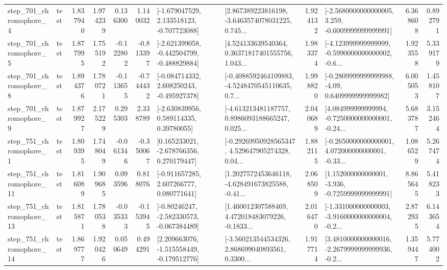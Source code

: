\begin{tabular}{llrrrrllrlrr}
   step\_701\_chromophore\_4 &      test &      1.837940 &    1.974239 &      0.136300 &  1.140032 &   [-1.679047529, 2.133518123, -0.707723088] &  [2.867389223816198, -3.6463574078031225, 0.745... &       1.924132 &  [-2.5680000000000005, 3.259, -0.6009999999999991] &            6.368608 &          0.892791 \\
   step\_701\_chromophore\_5 &      test &      1.877995 &    1.755192 &     -0.122802 & -0.813397 &  [-2.621399058, -0.442504799, -0.488829884] &  [4.524133639540364, 0.36371817401555756, 1.043... &       1.983374 &  [-4.123999999999999, -0.5990000000000002, -0.6... &            1.923558 &          5.339179 \\
   step\_701\_chromophore\_8 &      test &      1.894376 &    1.780721 &     -0.113655 & -0.744432 &   [-0.084714332, 2.608250243, -0.495927378] &  [-0.4088592464109883, -4.5248470545110635, 0.7... &       1.998820 &   [-0.2809999999999988, -4.09, 0.6409999999999982] &            6.005053 &          1.458107 \\
   step\_701\_chromophore\_9 &      test &      1.879927 &    2.175229 &      0.295303 &  2.338789 &     [-2.630839956, 0.589114335, 0.39780055] &  [-4.613213481187757, 0.8986093188665247, 0.025... &       2.040689 &  [4.084999999999994, -0.7250000000000001, -0.24... &            5.683787 &          3.152464 \\
   step\_751\_chromophore\_1 &      test &      1.809395 &    1.748049 &     -0.061346 & -0.350067 &    [0.165233021, -2.678766356, 0.270179447] &  [-0.29269950928565347, 4.529647905274328, 0.04... &       1.882115 &  [-0.2650000000000001, 4.072000000000001, -0.33... &            1.086529 &          5.267474 \\
  step\_751\_chromophore\_11 &      test &      1.816089 &    1.909685 &      0.093596 &  0.818076 &    [-0.911657285, 2.607266777, 0.080771641] &  [1.2027572453646118, -4.628491673825588, -0.41... &       2.068509 &   [1.152000000000001, -3.936, -0.7259999999999991] &            8.865645 &          5.418233 \\
  step\_751\_chromophore\_13 &      test &      1.815871 &    1.780538 &     -0.035333 & -0.153945 &   [-0.80246247, -2.582330573, -0.067384489] &  [1.460012307588469, 4.472018483079226, -0.1833... &       2.016470 &  [-1.331000000000003, -3.9160000000000004, -0.2... &            2.872935 &          6.143654 \\
  step\_751\_chromophore\_14 &      test &      1.869777 &    1.920426 &      0.050649 &  0.494291 &   [2.209663076, -1.515558449, -0.179512776] &  [-3.560213544534326, 2.868699040893561, 0.3300... &       1.917714 &  [3.4810000000000016, -2.2679999999999936, -0.2... &            1.359447 &          5.774002 \\

\end{tabular}
